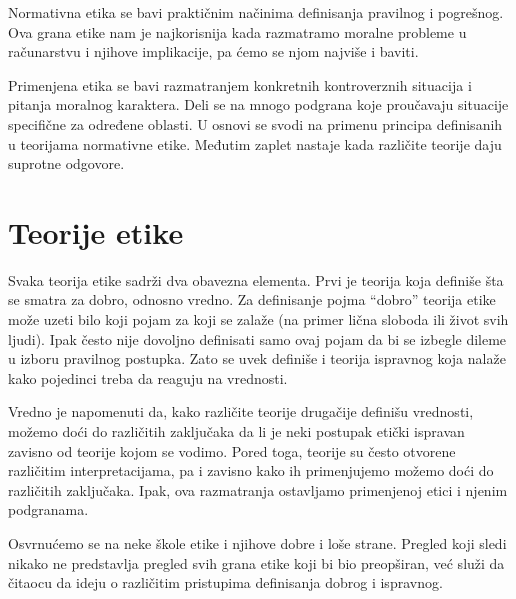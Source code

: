 \documentclass[a4paper]{article}
\begin{document}
Normativna etika se bavi praktičnim načinima definisanja pravilnog i pogrešnog. Ova grana etike nam je najkorisnija kada razmatramo moralne probleme u računarstvu i njihove implikacije, pa ćemo se njom najviše i baviti. 

Primenjena etika se bavi razmatranjem konkretnih kontroverznih situacija i pitanja moralnog karaktera. Deli se na mnogo podgrana koje proučavaju situacije specifične za određene oblasti. U osnovi se svodi na primenu principa definisanih u teorijama normativne etike. Međutim zaplet nastaje kada različite teorije daju suprotne odgovore. 

\section{Teorije etike}
Svaka teorija etike sadrži dva obavezna elementa. Prvi je teorija koja definiše šta se smatra za dobro, odnosno vredno. Za definisanje pojma ``dobro'' teorija etike može uzeti bilo koji pojam za koji se zalaže (na primer lična sloboda ili život svih ljudi). Ipak često nije dovoljno definisati samo ovaj pojam da bi se izbegle dileme u izboru pravilnog postupka. Zato se uvek definiše i teorija ispravnog koja nalaže kako pojedinci treba da reaguju na vrednosti. 

Vredno je napomenuti da, kako različite teorije drugačije definišu vrednosti, možemo doći do različitih zaključaka da li je neki postupak etički ispravan zavisno od teorije kojom se vodimo. Pored toga, teorije su često otvorene različitim interpretacijama, pa i zavisno kako ih primenjujemo možemo doći do različitih zaključaka. Ipak, ova razmatranja ostavljamo primenjenoj etici i njenim podgranama. 

Osvrnućemo se na neke škole etike i njihove dobre i loše strane. Pregled koji sledi nikako ne predstavlja pregled svih grana etike koji bi bio preopširan, već služi da čitaocu da ideju o različitim pristupima definisanja dobrog i ispravnog. 
\end{document}
